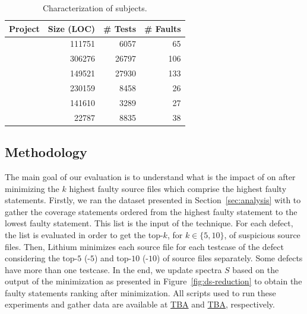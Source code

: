 \documentclass{article}
\begin{document}
\newcommand{\cgray}[1]{\cellcolor{gray!25}#1}
\begin{table}[h]
  \centering
  \setlength{\tabcolsep}{4pt}
    \begin{tabular}{lrrr}
      \toprule
      Project            & Size (LOC) & \# Tests & \# Faults \\ %
      \midrule
      \lang{}            & 111751  & 6057 & 65       \\   %
      \cmath{}           & 306276  & 26797 & 106     \\   %
      \closure{}         & 149521  & 27930  & 133     \\   %
      \chart{}           & 230159  & 8458 & 26      \\  %
      \jtime{}           & 141610  & 3289 & 27       \\   %
      \mockito{}         & 22787  & 8835 & 38    \\     %
      \bottomrule
  \end{tabular}
\caption {Characterization of \dfj{} subjects.}
\label{tab:df4j}
\end{table}
\normalsize


\subsection{Methodology}\label{sec:methodology}


The main goal of our evaluation is to understand what is the impact of \ds{} on 
\sfl{} after minimizing the $k$ highest faulty source files which comprise the highest faulty statements. Firstly, we ran the dataset presented in Section~\ref{sec:analysis} with \sfl{} to 
gather the coverage statements ordered from the highest faulty statement to the
lowest faulty statement. This list is the input of the \comb{} technique. For each defect, the list is evaluated in order to get the top-$k$, for $k\in\{5,10\}$, of suspicious source files. Then, Lithium minimizes each source file for each testcase of the defect considering the top-$5$ (\comb{}-$5$) and top-$10$ (\comb{}-$10$) of source files separately. Some defects have more than one testcase. In the end, we update spectra $S$ based on the output of the minimization as presented in Figure~\ref{fig:ds-reduction} to obtain the faulty statements ranking after minimization. All scripts used to run these experiments and gather data are available at \url{TBA} and \url{TBA}, respectively.
\end{document}
